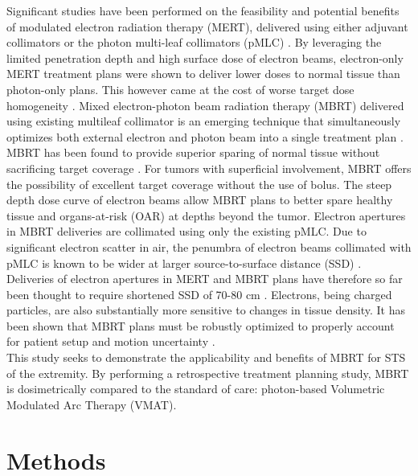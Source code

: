 \documentclass[aapm,graphicx,superscriptaddress]{revtex4-1}
\begin{document}
Significant studies have been performed on the feasibility and potential benefits of modulated electron radiation therapy (MERT), delivered using either adjuvant collimators \cite{Lee2000,Ma2000,Hogstrom2004,Gauer2006,Gauer2008,Al-Yahya2007,Alexander2010,Connell2014} or the photon multi-leaf collimators (pMLC) \cite{Lee2000,DuPlessis2006,Klein2008,Salguero2009,Henzen2014}. By leveraging the limited penetration depth and high surface dose of electron beams, electron-only MERT treatment plans were shown to deliver lower doses to normal tissue than photon-only plans. This however came at the cost of worse target dose homogeneity \cite{Alexander2012, Henzen2014}. Mixed electron-photon beam radiation therapy (MBRT) delivered using existing multileaf collimator is an emerging technique that simultaneously optimizes both external electron and photon beam into a single treatment plan \cite{Palma2012, Miguez2017, Renaud2017, Mueller2017, Mueller2018, Renaud2019, Heath2021}. MBRT has been found to provide superior sparing of normal tissue without sacrificing target coverage \cite{Palma2012, Renaud2017, Mueller2017, Mueller2018}. For tumors with superficial involvement, MBRT offers the possibility of excellent target coverage without the use of bolus. 
The steep depth dose curve of electron beams allow MBRT plans to better spare healthy tissue and organs-at-risk (OAR) at depths beyond the tumor. Electron apertures in MBRT deliveries are collimated using only the existing pMLC. Due to significant electron scatter in air, the penumbra of electron beams collimated with pMLC is known to be wider at larger source-to-surface distance (SSD) \cite{Klein1996, DuPlessis2006}. 
Deliveries of electron apertures in MERT and MBRT plans have therefore so far been thought to require shortened SSD of 70-80 cm \cite{Mueller2018Electron}.
Electrons, being charged particles, are also substantially more sensitive to changes in tissue density. It has been shown that MBRT plans must be robustly optimized to properly account for patient setup and motion uncertainty \cite{Renaud2019}. \\

This study seeks to demonstrate the applicability and benefits of MBRT for STS of the extremity. By performing a retrospective treatment planning study, MBRT is dosimetrically compared to the standard of care: photon-based Volumetric Modulated Arc Therapy (VMAT).

\section{Methods}
\end{document}
